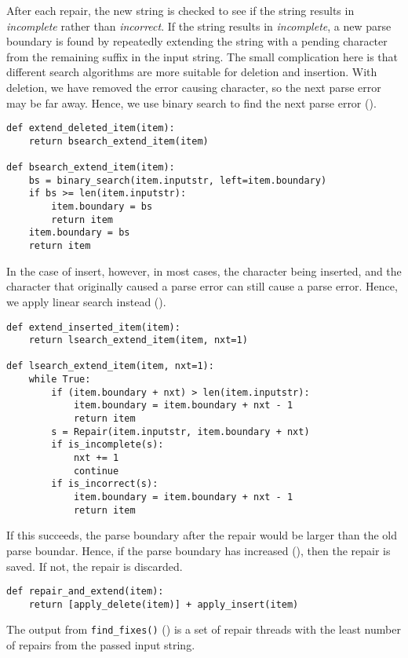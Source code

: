 \documentclass[sigconf,review,anonymous]{acmart}
\def\<#1>{\texttt{#1}}
\begin{document}
After each repair, the new string is checked  to see if
the string results in \emph{incomplete} rather than \emph{incorrect}. If the
string results in \emph{incomplete}, a new parse boundary is found by
repeatedly extending the string with a pending character from the remaining
suffix in the input string. The small complication here is that different
search algorithms are more suitable for deletion and insertion. With deletion,
we have removed the error causing character, so the next parse error may
be far away. Hence, we use binary search to find the next parse error ().
\begin{lstlisting}[caption=Extend the boundary,label={lst:extenditem}]
def extend_deleted_item(item):
    return bsearch_extend_item(item)

def bsearch_extend_item(item):
    bs = binary_search(item.inputstr, left=item.boundary)
    if bs >= len(item.inputstr):
        item.boundary = bs
        return item
    item.boundary = bs
    return item
\end{lstlisting}
In the case of insert, however, in most cases, the character being inserted,
and the character that originally caused a parse error can still cause a parse
error. Hence, we apply linear search instead ().
\begin{lstlisting}[caption=Extend the boundary,label={lst:extenditeminsert}]
def extend_inserted_item(item):
    return lsearch_extend_item(item, nxt=1)

def lsearch_extend_item(item, nxt=1):
    while True:
        if (item.boundary + nxt) > len(item.inputstr):
            item.boundary = item.boundary + nxt - 1
            return item
        s = Repair(item.inputstr, item.boundary + nxt)
        if is_incomplete(s):
            nxt += 1
            continue
        if is_incorrect(s):
            item.boundary = item.boundary + nxt - 1
            return item
\end{lstlisting}
If this succeeds, the parse boundary after the repair
would be larger than the old parse boundar. Hence, if the parse boundary has
increased (), then
the
repair is saved. If not, the repair is discarded.
\begin{lstlisting}[caption=Repair and extend,label={lst:repairandextend}]
def repair_and_extend(item):
    return [apply_delete(item)] + apply_insert(item)
\end{lstlisting}
The output from \<find\_fixes()> () is a set of repair
threads with the least number of repairs from the passed input string.
\end{document}
